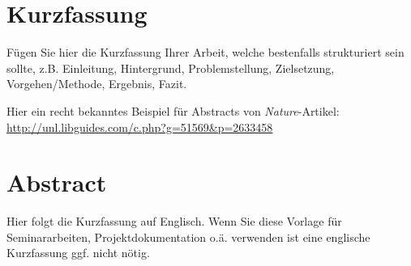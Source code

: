 \chapter*{Kurzfassung}
Fügen Sie hier die Kurzfassung Ihrer Arbeit, welche bestenfalls strukturiert sein sollte, z.B. Einleitung, Hintergrund, Problemstellung, Zielsetzung, Vorgehen/Methode, Ergebnis, Fazit. 

Hier ein recht bekanntes Beispiel für Abstracts von \textit{Nature}-Artikel:
\url{http://unl.libguides.com/c.php?g=51569&p=2633458}

\newpage
\chapter*{Abstract}
Hier folgt die Kurzfassung auf Englisch. Wenn Sie diese Vorlage für Seminararbeiten, Projektdokumentation o.ä. verwenden ist eine englische Kurzfassung ggf. nicht nötig.
